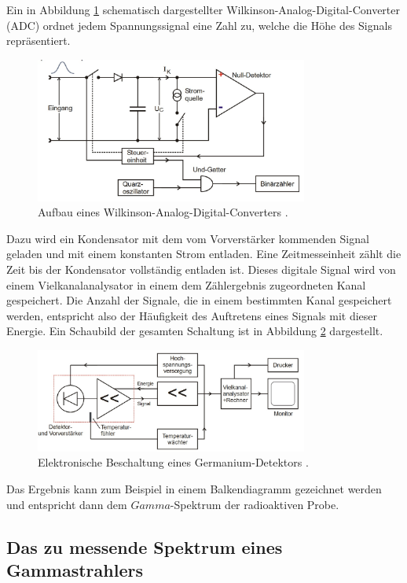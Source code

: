 Ein in Abbildung \ref{fig:t:2} schematisch dargestellter Wilkinson-Analog-Digital-Converter (ADC) ordnet jedem Spannungssignal eine Zahl zu, welche die Höhe des Signals repräsentiert.
\begin{figure}
\centering
\includegraphics[width=0.8\textwidth]{content/skizzen/aufbau3.jpg}
\caption{Aufbau eines Wilkinson-Analog-Digital-Converters \cite{sample}.}
\label{fig:t:2}
\end{figure}
Dazu wird ein Kondensator mit dem vom Vorverstärker kommenden Signal geladen und mit einem konstanten Strom entladen.
Eine Zeitmesseinheit zählt die Zeit bis der Kondensator vollständig entladen ist.
Dieses digitale Signal wird von einem Vielkanalanalysator in einem dem Zählergebnis zugeordneten Kanal gespeichert.
Die Anzahl der Signale, die in einem bestimmten Kanal gespeichert werden, entspricht also der Häufigkeit des Auftretens eines Signals mit dieser Energie.
Ein Schaubild der gesamten Schaltung ist in Abbildung \ref{fig:t:3} dargestellt.
\begin{figure}
\centering
\includegraphics[width=0.8\textwidth]{content/skizzen/aufbau4.jpg}
\caption{Elektronische Beschaltung eines Germanium-Detektors \cite{sample}.}
\label{fig:t:3}
\end{figure}
Das Ergebnis kann zum Beispiel in einem Balkendiagramm gezeichnet werden und entspricht dann dem $Gamma$-Spektrum der radioaktiven Probe.


\subsection{Das zu messende Spektrum eines Gammastrahlers}
\label{subsec:spektrum}

